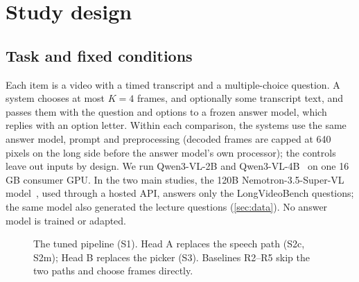 \section{Study design}
\label{sec:study}

\subsection{Task and fixed conditions}
Each item is a video with a timed transcript and a multiple-choice question.
A system chooses at most $K{=}4$ frames, and optionally some transcript text, and passes them with the question and options to a frozen answer model, which replies with an option letter.
Within each comparison, the systems use the same answer model, prompt and preprocessing (decoded frames are capped at 640 pixels on the long side before the answer model's own processor); the controls leave out inputs by design.
We run Qwen3-VL-2B and Qwen3-VL-4B~\cite{bai2025qwen3vl} on one 16\,GB consumer GPU.
In the two main studies, the 120B Nemotron-3.5-Super-VL model~\cite{nvidia2026nemotron}, used through a hosted API, answers only the LongVideoBench questions; the same model also generated the lecture questions (\cref{sec:data}).
No answer model is trained or adapted.

\begin{figure}[t]
\centering
{}
\caption{The tuned pipeline (S1). Head A replaces the speech path (S2c, S2m); Head B replaces the picker (S3). Baselines R2--R5 skip the two paths and choose frames directly.}
\label{fig:pipeline}
\end{figure}

